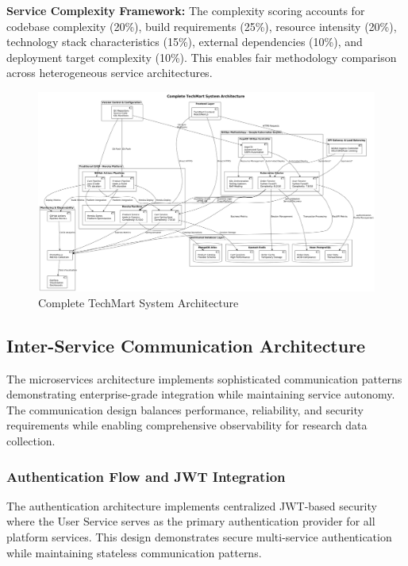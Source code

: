 \textbf{Service Complexity Framework:}
The complexity scoring accounts for codebase complexity (20\%), build requirements (25\%), resource intensity (20\%), technology stack characteristics (15\%), external dependencies (10\%), and deployment target complexity (10\%). This enables fair methodology comparison across heterogeneous service architectures.

\begin{figure}[h]
\centering
\includegraphics[width=1.0\textwidth]{figures/Complete-System-Architecture-Diagram.png}
\caption{Complete TechMart System Architecture}
\label{fig:complete-system-architecture}
\end{figure}



\subsection{Inter-Service Communication Architecture}

The microservices architecture implements sophisticated communication patterns demonstrating enterprise-grade integration while maintaining service autonomy. The communication design balances performance, reliability, and security requirements while enabling comprehensive observability for research data collection.

\subsubsection{Authentication Flow and JWT Integration}

The authentication architecture implements centralized JWT-based security where the User Service serves as the primary authentication provider for all platform services. This design demonstrates secure multi-service authentication while maintaining stateless communication patterns.

